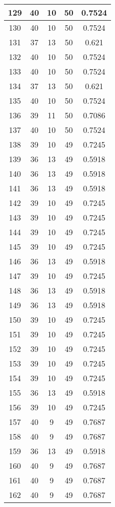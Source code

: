 \documentclass[letterpaper, 12pt]{article}
\begin{document}
\begin{longtable}{|c|c|c|c|c|}
\hline
129 & 40 & 10 & 50 & 0.7524 \\
\hline
130 & 40 & 10 & 50 & 0.7524 \\
\hline
131 & 37 & 13 & 50 & 0.621 \\
\hline
132 & 40 & 10 & 50 & 0.7524 \\
\hline
133 & 40 & 10 & 50 & 0.7524 \\
\hline
134 & 37 & 13 & 50 & 0.621 \\
\hline
135 & 40 & 10 & 50 & 0.7524 \\
\hline
136 & 39 & 11 & 50 & 0.7086 \\
\hline
137 & 40 & 10 & 50 & 0.7524 \\
\hline
138 & 39 & 10 & 49 & 0.7245 \\
\hline
139 & 36 & 13 & 49 & 0.5918 \\
\hline
140 & 36 & 13 & 49 & 0.5918 \\
\hline
141 & 36 & 13 & 49 & 0.5918 \\
\hline
142 & 39 & 10 & 49 & 0.7245 \\
\hline
143 & 39 & 10 & 49 & 0.7245 \\
\hline
144 & 39 & 10 & 49 & 0.7245 \\
\hline
145 & 39 & 10 & 49 & 0.7245 \\
\hline
146 & 36 & 13 & 49 & 0.5918 \\
\hline
147 & 39 & 10 & 49 & 0.7245 \\
\hline
148 & 36 & 13 & 49 & 0.5918 \\
\hline
149 & 36 & 13 & 49 & 0.5918 \\
\hline
150 & 39 & 10 & 49 & 0.7245 \\
\hline
151 & 39 & 10 & 49 & 0.7245 \\
\hline
152 & 39 & 10 & 49 & 0.7245 \\
\hline
153 & 39 & 10 & 49 & 0.7245 \\
\hline
154 & 39 & 10 & 49 & 0.7245 \\
\hline
155 & 36 & 13 & 49 & 0.5918 \\
\hline
156 & 39 & 10 & 49 & 0.7245 \\
\hline
157 & 40 & 9 & 49 & 0.7687 \\
\hline
158 & 40 & 9 & 49 & 0.7687 \\
\hline
159 & 36 & 13 & 49 & 0.5918 \\
\hline
160 & 40 & 9 & 49 & 0.7687 \\
\hline
161 & 40 & 9 & 49 & 0.7687 \\
\hline
162 & 40 & 9 & 49 & 0.7687 \\

\end{longtable}
\end{document}
